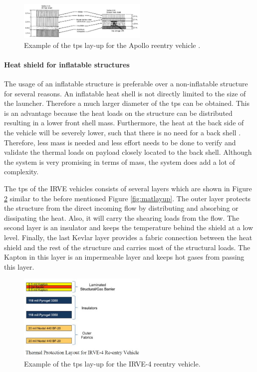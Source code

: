 \begin{figure}[H]
\centering
\includegraphics[width = 0.55\textwidth]{Figure/tpsApollo.png}
\caption[Example of the \gls{tps} lay-up for the Apollo reentry vehicle]{Example of the \gls{tps} lay-up for the Apollo reentry vehicle \cite[p.5]{Pavlosky1974}.}
\label{fig:tpslayupapollo}
\end{figure}

\paragraph{Heat shield for inflatable structures}
The usage of  an inflatable structure is preferable over a non-inflatable structure for several reasons. An inflatable heat shell is not directly limited to the size of the launcher. Therefore a much larger diameter of the \gls{tps} can be obtained. This is an advantage because the heat loads on the structure can be distributed resulting in a lower front shell mass. Furthermore, the heat at the back side of the vehicle will be severely lower, such that there is no need for a back shell \cite{Hughes2005}. Therefore, less mass is needed and less effort needs to be done to verify and validate the thermal loads on payload closely located to the back shell. Although the system is very promising in terms of mass, the system does add a lot of complexity. 

The \gls{tps} of the IRVE vehicles consists of several layers \cite{Litton2011} which are shown in Figure \ref{fig:tpslayup} similar to the before mentioned Figure \ref{fig:matlayup}. The outer layer protects the structure from the direct incoming flow by distributing and absorbing or dissipating the heat. Also, it will carry the shearing loads from the flow. The second layer is an insulator and keeps the temperature behind the shield at a low level. Finally, the last Kevlar layer provides a fabric connection between the heat shield and the rest of the structure and carries most of the structural loads. The Kapton in this layer is an impermeable layer and keeps hot gases from passing this layer.

\begin{figure}[H]
\centering
\includegraphics[width = 0.55\textwidth]{Figure/IRVE4TPS.jpg}
\caption[Example of the \gls{tps} lay-up for the IRVE-4 reentry vehicle]{Example of the \gls{tps} lay-up for the IRVE-4 reentry vehicle\cite[p.6]{Litton2011}.}
\label{fig:tpslayup}
\end{figure}

